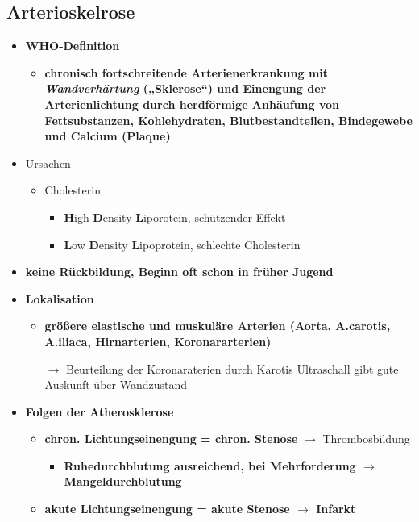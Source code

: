 \subsection{Arterioskelrose}
	\begin{itemize}
		\item \textbf{WHO-Definition}
			\begin{itemize}
				\item  \textbf{chronisch fortschreitende Arterienerkrankung mit \emph{Wandverhärtung} („Sklerose“) und Einengung der Arterienlichtung durch herdförmige Anhäufung von Fettsubstanzen, Kohlehydraten, Blutbestandteilen, Bindegewebe und Calcium (Plaque)}
			\end{itemize}
		\item Ursachen
			\begin{itemize}
				\item Cholesterin
					\begin{itemize}
						\item \textbf{H}igh \textbf{D}ensity \textbf{L}iporotein, schützender Effekt
						\item \textbf{L}ow \textbf{D}ensity \textbf{L}ipoprotein, schlechte Cholesterin
					\end{itemize}
			\end{itemize}
		\item \textbf{keine Rückbildung, Beginn oft schon in früher Jugend}
\pagebreak			
		\item \textbf{Lokalisation}
			\begin{itemize}
				\item \textbf{größere elastische und muskuläre Arterien (Aorta, A.carotis, A.iliaca, Hirnarterien, Koronararterien)}
				\item[$\rightarrow$] Beurteilung der Koronaraterien durch Karotis Ultraschall gibt gute Auskunft über Wandzustand
			\end{itemize}
		\item \textbf{Folgen der Atherosklerose}
			\begin{itemize}
					\item \textbf{chron. Lichtungseinengung = chron. Stenose} $\rightarrow$ Thrombosbildung
						\begin{itemize}
							\item \textbf{Ruhedurchblutung ausreichend, bei Mehrforderung $\rightarrow$ Mangeldurchblutung}
						\end{itemize}
					\item \textbf{akute Lichtungseinengung = akute Stenose $\rightarrow$ Infarkt}

\end{itemize}
\end{itemize}

